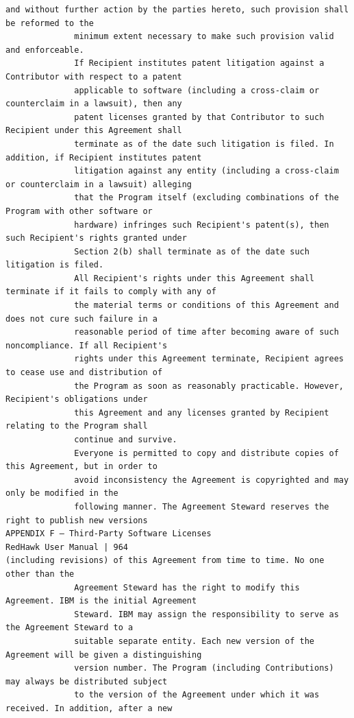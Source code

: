 \begin{lstlisting}[basicstyle=\ttfamily\scriptsize,breaklines=true]
              and without further action by the parties hereto, such provision shall be reformed to the
              minimum extent necessary to make such provision valid and enforceable.
              If Recipient institutes patent litigation against a Contributor with respect to a patent
              applicable to software (including a cross-claim or counterclaim in a lawsuit), then any
              patent licenses granted by that Contributor to such Recipient under this Agreement shall
              terminate as of the date such litigation is filed. In addition, if Recipient institutes patent
              litigation against any entity (including a cross-claim or counterclaim in a lawsuit) alleging
              that the Program itself (excluding combinations of the Program with other software or
              hardware) infringes such Recipient's patent(s), then such Recipient's rights granted under
              Section 2(b) shall terminate as of the date such litigation is filed.
              All Recipient's rights under this Agreement shall terminate if it fails to comply with any of
              the material terms or conditions of this Agreement and does not cure such failure in a
              reasonable period of time after becoming aware of such noncompliance. If all Recipient's
              rights under this Agreement terminate, Recipient agrees to cease use and distribution of
              the Program as soon as reasonably practicable. However, Recipient's obligations under
              this Agreement and any licenses granted by Recipient relating to the Program shall
              continue and survive.
              Everyone is permitted to copy and distribute copies of this Agreement, but in order to
              avoid inconsistency the Agreement is copyrighted and may only be modified in the
              following manner. The Agreement Steward reserves the right to publish new versions
APPENDIX F — Third-Party Software Licenses                                     RedHawk User Manual | 964
(including revisions) of this Agreement from time to time. No one other than the
              Agreement Steward has the right to modify this Agreement. IBM is the initial Agreement
              Steward. IBM may assign the responsibility to serve as the Agreement Steward to a
              suitable separate entity. Each new version of the Agreement will be given a distinguishing
              version number. The Program (including Contributions) may always be distributed subject
              to the version of the Agreement under which it was received. In addition, after a new

\end{lstlisting}
